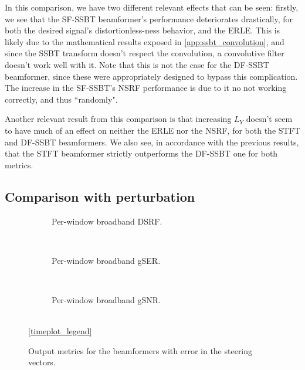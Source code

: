In this comparison, we have two different relevant effects that can be seen: firstly, we see that the SF-SSBT beamformer's performance deteriorates drastically, for both the desired signal's distortionless-ness behavior, and the ERLE. This is likely due to the mathematical results exposed in \cref{app:ssbt_convolution}, and since the SSBT transform doesn't respect the convolution, a convolutive filter doesn't work well with it. Note that this is not the case for the DF-SSBT beamformer, since these were appropriately designed to bypass this complication. The increase in the SF-SSBT's NSRF performance is due to it no not working correctly, and thus ``randomly".

Another relevant result from this comparison is that increasing $L_Y$ doesn't seem to have much of an effect on neither the ERLE nor the NSRF, for both the STFT and DF-SSBT beamformers. We also see, in accordance with the previous results, that the STFT beamformer strictly outperforms the DF-SSBT one for both metrics.

\subsection{Comparison with perturbation}

\begin{figure}[!t]
	\centering
	\begin{subfigure}{\textwidth}
		\centering
		
		\caption{Per-window broadband DSRF.}
		\label{subfig:lineplot__v7__DSRF__iSER_n15__Ly_1__err_var}
	\end{subfigure}\\[1em]
	\begin{subfigure}{\textwidth}
		\centering
		
		\caption{Per-window broadband gSER.}
		\label{subfig:lineplot__v7__gSER__iSER_n15__Ly_1__err_var}
	\end{subfigure}\\[1em]
	\begin{subfigure}{\textwidth}
		\centering
		
		\caption{Per-window broadband gSNR.}
		\label{subfig:lineplot__v7__gSNR__iSER_n15__Ly_1__err_var}
	\end{subfigure}\\[1em]
	\ref*{timeplot_legend}
	\caption{Output metrics for the beamformers with error in the steering vectors.}
	\label{fig:lineplot__v7_iSER_n15__Ly_1__err_var}
\end{figure}

